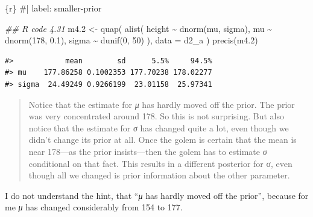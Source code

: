\documentclass[
  letterpaper,
  DIV=11,
  numbers=noendperiod]{scrreprt}
\newenvironment{Shaded}{\begin{snugshade}}{\end{snugshade}}
\newcommand{\AttributeTok}[1]{\textcolor[rgb]{0.40,0.45,0.13}{#1}}
\newcommand{\CommentTok}[1]{\textcolor[rgb]{0.37,0.37,0.37}{#1}}
\newcommand{\DecValTok}[1]{\textcolor[rgb]{0.68,0.00,0.00}{#1}}
\newcommand{\DocumentationTok}[1]{\textcolor[rgb]{0.37,0.37,0.37}{\textit{#1}}}
\newcommand{\FloatTok}[1]{\textcolor[rgb]{0.68,0.00,0.00}{#1}}
\newcommand{\FunctionTok}[1]{\textcolor[rgb]{0.28,0.35,0.67}{#1}}
\newcommand{\InformationTok}[1]{\textcolor[rgb]{0.37,0.37,0.37}{#1}}
\newcommand{\NormalTok}[1]{\textcolor[rgb]{0.00,0.23,0.31}{#1}}
\newcommand{\OtherTok}[1]{\textcolor[rgb]{0.00,0.23,0.31}{#1}}
\newcommand{\SpecialCharTok}[1]{\textcolor[rgb]{0.37,0.37,0.37}{#1}}
\begin{document}
\begin{Shaded}
\begin{Highlighting}[]
\InformationTok{\textasciigrave{}\textasciigrave{}\textasciigrave{}\{r\}}
\CommentTok{\#| label: smaller{-}prior}

\DocumentationTok{\#\# R code 4.31}
\NormalTok{m4}\FloatTok{.2} \OtherTok{\textless{}{-}} \FunctionTok{quap}\NormalTok{(}
  \FunctionTok{alist}\NormalTok{(}
\NormalTok{    height }\SpecialCharTok{\textasciitilde{}} \FunctionTok{dnorm}\NormalTok{(mu, sigma),}
\NormalTok{    mu }\SpecialCharTok{\textasciitilde{}} \FunctionTok{dnorm}\NormalTok{(}\DecValTok{178}\NormalTok{, }\FloatTok{0.1}\NormalTok{),}
\NormalTok{    sigma }\SpecialCharTok{\textasciitilde{}} \FunctionTok{dunif}\NormalTok{(}\DecValTok{0}\NormalTok{, }\DecValTok{50}\NormalTok{)}
\NormalTok{  ),}
  \AttributeTok{data =}\NormalTok{ d2\_a}
\NormalTok{)}
\FunctionTok{precis}\NormalTok{(m4}\FloatTok{.2}\NormalTok{)}
\InformationTok{\textasciigrave{}\textasciigrave{}\textasciigrave{}}
\end{Highlighting}
\end{Shaded}

\begin{verbatim}
#>            mean        sd      5.5%     94.5%
#> mu    177.86258 0.1002353 177.70238 178.02277
#> sigma  24.49249 0.9266199  23.01158  25.97341
\end{verbatim}

\begin{quote}
Notice that the estimate for \emph{μ} has hardly moved off the prior.
The prior was very concentrated around 178. So this is not surprising.
But also notice that the estimate for \emph{σ} has changed quite a lot,
even though we didn't change its prior at all. Once the golem is certain
that the mean is near 178---as the prior insists---then the golem has to
estimate \emph{σ} conditional on that fact. This results in a different
posterior for σ, even though all we changed is prior information about
the other parameter.
\end{quote}

\begin{tcolorbox}[enhanced jigsaw, colframe=quarto-callout-caution-color-frame, colback=white, toprule=.15mm, breakable, arc=.35mm, bottomtitle=1mm, colbacktitle=quarto-callout-caution-color!10!white, toptitle=1mm, titlerule=0mm, title=\textcolor{quarto-callout-caution-color}{\faFire}\hspace{0.5em}{Change of μ?}, leftrule=.75mm, opacityback=0, rightrule=.15mm, opacitybacktitle=0.6, bottomrule=.15mm, left=2mm, coltitle=black]

I do not understand the hint, that ``\emph{μ} has hardly moved off the
prior'', because for me \emph{μ} has changed considerably from 154 to
177.

\end{tcolorbox}
\end{document}
